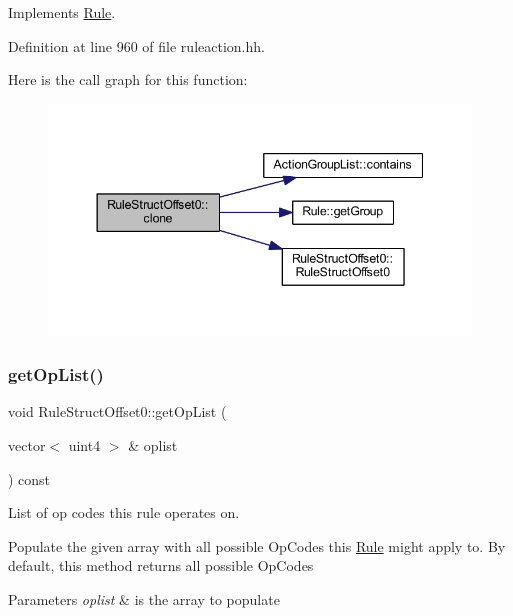 Implements \mbox{\hyperlink{class_rule_a70de90a76461bfa7ea0b575ce3c11e4d}{Rule}}.



Definition at line 960 of file ruleaction.\+hh.

Here is the call graph for this function\+:
\nopagebreak
\begin{figure}[H]
\begin{center}
\leavevmode
\includegraphics[width=344pt]{class_rule_struct_offset0_a97dcd1e2e1e0649e22d204e21986bc93_cgraph}
\end{center}
\end{figure}
\mbox{\label{class_rule_struct_offset0_a332cb22239db665109ec37527e497dd1}} 
\subsubsection{\texorpdfstring{getOpList()}{getOpList()}}
{\footnotesize\ttfamily void Rule\+Struct\+Offset0\+::get\+Op\+List (\begin{DoxyParamCaption}\item[{vector$<$ uint4 $>$ \&}]{oplist }\end{DoxyParamCaption}) const\hspace{0.3cm}{\ttfamily [virtual]}}



List of op codes this rule operates on. 

Populate the given array with all possible Op\+Codes this \mbox{\hyperlink{class_rule}{Rule}} might apply to. By default, this method returns all possible Op\+Codes 
\begin{DoxyParams}{Parameters}
{\em oplist} & is the array to populate \\
\hline
\end{DoxyParams}


